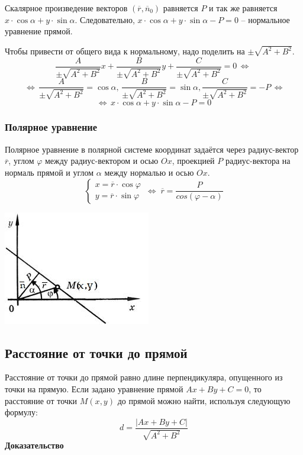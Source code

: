 \documentclass{article}
\begin{document}
Скалярное произведение векторов $(\overline{r},\overline{n}_0)$ равняется $P$ и так же равняется $x\cdot\cos\alpha+y\cdot\sin\alpha$. Следовательно, $x\cdot\cos\alpha+y\cdot\sin\alpha-P=0$ -- нормальное уравнение прямой.

Чтобы привести от общего вида к нормальному, надо поделить на $\pm\sqrt{A^2+B^2}$.
$$ \frac{A}{\pm\sqrt{A^2+B^2}}x+\frac{B}{\pm\sqrt{A^2+B^2}}y+\frac{C}{\pm\sqrt{A^2+B^2}}=0\,\Leftrightarrow\, $$
$$\,\Leftrightarrow\,\frac{A}{\pm\sqrt{A^2+B^2}} = \cos\alpha,\,\frac{B}{\pm\sqrt{A^2+B^2}}=\sin\alpha, \frac{C}{\pm\sqrt{A^2+B^2}}=-P\,\Leftrightarrow$$
$$ \Leftrightarrow\,x\cdot\cos\alpha+y\cdot\sin\alpha-P=0$$
\newpage
\subsubsection{Полярное уравнение} 
Полярное уравнение в полярной системе координат задаётся через радиус-вектор $\overline{r}$, углом $\varphi$ между радиус-вектором и осью $Ox$, проекцией $P$ радиус-вектора на нормаль прямой и углом $\alpha$ между нормалью и осью $Ox$.
$$ \begin{cases} x=\overline{r}\cdot\cos\varphi \\y=\overline{r}\cdot\sin\varphi \end{cases}\,\Leftrightarrow\;\overline{r}=\frac{P}{cos(\varphi-\alpha)} $$
\begin{center}
\includegraphics[scale=0.8]{2.jpg}
\end{center}
\subsection{Расстояние от точки до прямой}
Расстояние от точки до прямой равно длине перпендикуляра, опущенного из точки на прямую. Если задано уравнение прямой $Ax + By + C = 0$, то расстояние от точки $M(x,y)$ до прямой можно найти, используя следующую формулу:
$$ d=\frac{|Ax+By+C|}{\sqrt{A^2+B^2}} $$
\textbf{Доказательство}
\end{document}
